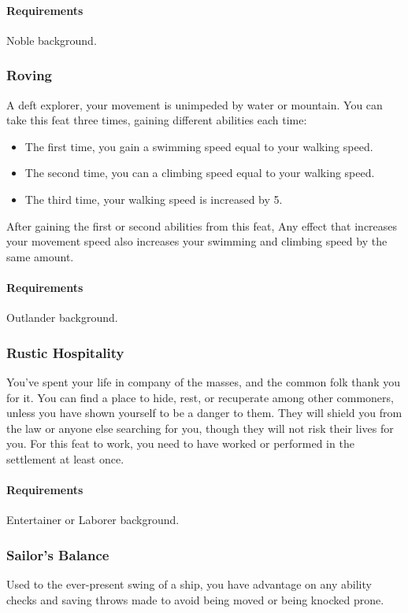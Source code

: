     \paragraph{Requirements} Noble background.
\subsubsection{Roving} \label{feat::roving}
    A deft explorer, your movement is unimpeded by water or mountain.
    You can take this feat three times, gaining different abilities each time:
    \begin{itemize}
        \item The first time, you gain a swimming speed equal to your walking speed.
        \item The second time, you can a climbing speed equal to your walking speed.
        \item The third time, your walking speed is increased by 5.
    \end{itemize}
    After gaining the first or second abilities from this feat, Any effect that increases your movement speed also increases your swimming and climbing speed by the same amount.
    \paragraph{Requirements} Outlander background.
\subsubsection{Rustic Hospitality} \label{feat::rustichospitality}
    You've spent your life in company of the masses, and the common folk thank you for it.
    You can find a place to hide, rest, or recuperate among other commoners, unless you have shown yourself to be a danger to them.
    They will shield you from the law or anyone else searching for you, though they will not risk their lives for you.
    For this feat to work, you need to have worked or performed in the settlement at least once.
    \paragraph{Requirements} Entertainer or Laborer background.
\subsubsection{Sailor's Balance} \label{feat::sailorsbalance}
    Used to the ever-present swing of a ship, you have advantage on any ability checks and saving throws made to avoid being moved or being knocked prone.
